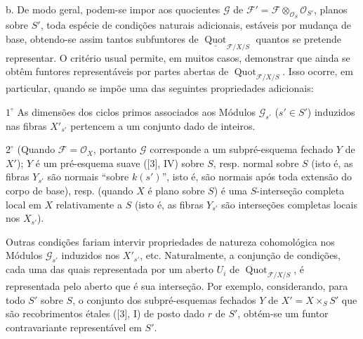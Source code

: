 \documentclass[11pt,twoside,openany]{book}
\numberwithin{equation}{section}
\theoremstyle{plain}
\theoremstyle{definition}
\theoremstyle{remark}
\begin{document}
\medskip
\noindent b. De modo geral, podem-se impor aos quocientes $\mathcal G$ de
$\mathcal F'=\mathcal F\otimes_{\mathcal O_S}\mathcal O_{S'}$, planos sobre
$S'$, toda espécie de condições naturais adicionais, estáveis por mudança de
base, obtendo-se assim tantos subfuntores de
$\underline{\operatorname{Quot}}_{\mathcal F/X/S}$ quantos se pretende
representar. O critério usual permite, em muitos casos, demonstrar que ainda se
obtêm funtores representáveis por partes abertas de
$\operatorname{Quot}_{\mathcal F/X/S}$. Isso ocorre, em particular, quando se
impõe uma das seguintes propriedades adicionais:

\smallskip
\noindent $1^\circ$ As dimensões dos ciclos primos associados aos Módulos
$\mathcal G_{s'}$ ($s'\in S'$) induzidos nas fibras $X'_{s'}$ pertencem a um
conjunto dado de inteiros.

\smallskip
\noindent $2^\circ$ (Quando $\mathcal F=\mathcal O_X$, portanto $\mathcal G$
corresponde a um subpré-esquema fechado $Y$ de $X'$); $Y$ é um pré-esquema
suave ([3], IV) sobre $S$, resp. normal sobre $S$ (isto é, as fibras $Y_{s'}$
são normais ``sobre $k(s')$'', isto é, são normais após toda extensão do corpo
de base), resp. (quando $X$ é plano sobre $S$) é uma $S$-interseção completa
local em $X$ relativamente a $S$ (isto é, as fibras $Y_{s'}$ são interseções
completas locais nos $X_{s'}$).

Outras condições fariam intervir propriedades de natureza cohomológica nos
Módulos $\mathcal G_{s'}$ induzidos nos $X'_{s'}$, etc. Naturalmente, a
conjunção de condições, cada uma das quais representada por um aberto $U_i$ de
$\operatorname{Quot}_{\mathcal F/X/S}$, é representada pelo aberto que é sua
interseção. Por exemplo, considerando, para todo $S'$ sobre $S$, o conjunto dos
subpré-esquemas fechados $Y$ de $X'=X\times_SS'$ que são recobrimentos étales
([3], I) de posto dado $r$ de $S'$, obtém-se um funtor contravariante
representável em $S'$.
\end{document}
